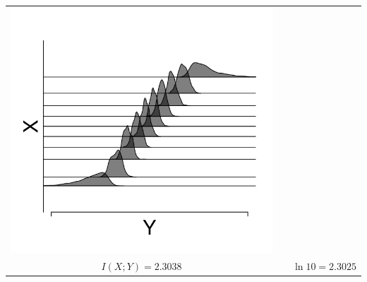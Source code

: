 \documentclass{beamer}
\begin{document}
\begin{frame}
\begin{center}
\begin{tabular}{ccc}
\includegraphics[scale = 0.23]{../info_theory_paper/bin_figure1a.png}\\
$I(X; Y) = 2.3038$ & & $\ln 10 = 2.3025$
\end{tabular}
\end{center}
\end{frame}
\end{document}

